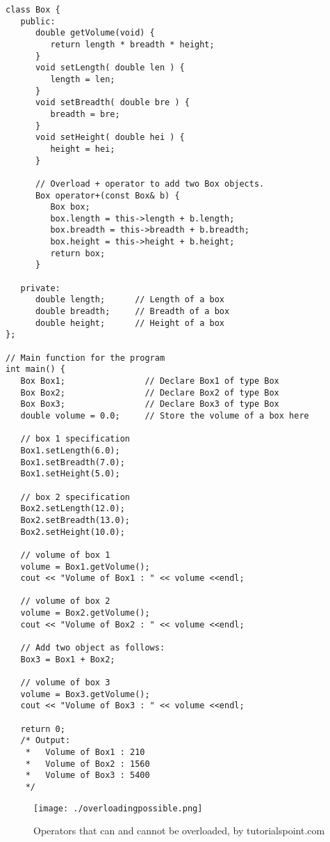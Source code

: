 \documentclass{article}
\begin{document}
\begin{lstlisting}
class Box {
   public:
      double getVolume(void) {
         return length * breadth * height;
      }
      void setLength( double len ) {
         length = len;
      }
      void setBreadth( double bre ) {
         breadth = bre;
      }
      void setHeight( double hei ) {
         height = hei;
      }
      
      // Overload + operator to add two Box objects.
      Box operator+(const Box& b) {
         Box box;
         box.length = this->length + b.length;
         box.breadth = this->breadth + b.breadth;
         box.height = this->height + b.height;
         return box;
      }
      
   private:
      double length;      // Length of a box
      double breadth;     // Breadth of a box
      double height;      // Height of a box
};

// Main function for the program
int main() {
   Box Box1;                // Declare Box1 of type Box
   Box Box2;                // Declare Box2 of type Box
   Box Box3;                // Declare Box3 of type Box
   double volume = 0.0;     // Store the volume of a box here
 
   // box 1 specification
   Box1.setLength(6.0); 
   Box1.setBreadth(7.0); 
   Box1.setHeight(5.0);
 
   // box 2 specification
   Box2.setLength(12.0); 
   Box2.setBreadth(13.0); 
   Box2.setHeight(10.0);
 
   // volume of box 1
   volume = Box1.getVolume();
   cout << "Volume of Box1 : " << volume <<endl;
 
   // volume of box 2
   volume = Box2.getVolume();
   cout << "Volume of Box2 : " << volume <<endl;

   // Add two object as follows:
   Box3 = Box1 + Box2;

   // volume of box 3
   volume = Box3.getVolume();
   cout << "Volume of Box3 : " << volume <<endl;

   return 0;
   /* Output:
	*	Volume of Box1 : 210
	*	Volume of Box2 : 1560
	*	Volume of Box3 : 5400
	*/
\end{lstlisting}

\begin{figure}[h!]
\texttt{[image: ./overloadingpossible.png]}
	\caption{Operators that can and cannot be overloaded, by tutorialspoint.com}
\end{figure}

\newpage
\end{document}
